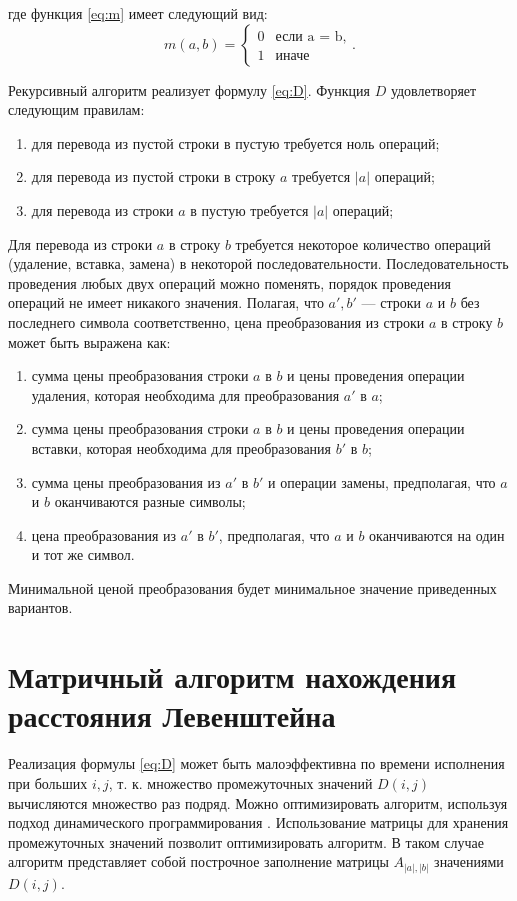 где функция \ref{eq:m} имеет следующий вид:
\begin{equation}
	\label{eq:m}
	m(a, b) = \begin{cases}
		0 &\text{если a = b,}\\
		1 &\text{иначе}
	\end{cases}.
\end{equation}

Рекурсивный алгоритм реализует формулу \ref{eq:D}.
Функция $D$ удовлетворяет следующим правилам:
\begin{enumerate}[label={\arabic*)}]
	\item для перевода из пустой строки в пустую требуется ноль операций;
	\item для перевода из пустой строки в строку $a$ требуется $|a|$ операций;
	\item для перевода из строки $a$ в пустую требуется $|a|$ операций;
\end{enumerate}
Для перевода из строки $a$ в строку $b$ требуется некоторое количество операций (удаление, вставка, замена) в некоторой последовательности. Последовательность проведения любых двух операций можно поменять, порядок проведения операций не имеет никакого значения. Полагая, что $a', b'$  — строки $a$ и $b$ без последнего символа соответственно, цена преобразования из строки $a$ в строку $b$ может быть выражена как:
	\begin{enumerate}[label={\arabic*)}]
		\item сумма цены преобразования строки $a$ в $b$ и цены проведения операции удаления, которая необходима для преобразования $a'$ в $a$;
		\item сумма цены преобразования строки $a$ в $b$  и цены проведения операции вставки, которая необходима для преобразования $b'$ в $b$;
		\item сумма цены преобразования из $a'$ в $b'$ и операции замены, предполагая, что $a$ и $b$ оканчиваются разные символы;
		\item цена преобразования из $a'$ в $b'$, предполагая, что $a$ и $b$ оканчиваются на один и тот же символ.
	\end{enumerate}
Минимальной ценой преобразования будет минимальное значение приведенных вариантов.

\section{Матричный алгоритм нахождения расстояния Левенштейна}

Реализация формулы \ref{eq:D} может быть малоэффективна по времени исполнения при больших $i, j$, т. к.  множество промежуточных значений $D(i, j)$ вычисляются множество раз подряд.
Можно оптимизировать алгоритм, используя подход динамического программирования \cite{dynamic_programming}. Использование матрицы для хранения промежуточных значений позволит оптимизировать алгоритм.  В таком случае алгоритм представляет собой построчное заполнение матрицы 
$A_{|a|,|b|}$ значениями $D(i, j)$.


